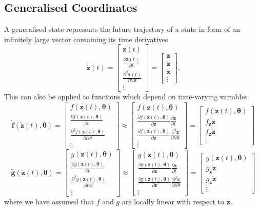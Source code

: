\documentclass[a4paper,10pt]{article}
\newcommand{\bs}[1]{\mathbf{#1}}					%
\newcommand{\bgs}[1]{\boldsymbol{#1}}				%
\newcommand{\pd}[2]{\frac{\partial #1}{\partial #2}} 	%
\newcommand{\ppd}[3]{\frac{\partial^2 #1}{\partial #2 \partial #3}} %
\newcommand{\eq}[1]{\begin{equation} #1 \end{equation}}%
\newcommand{\gc}[1]{\tilde{#1}} %
\renewcommand{\ss}{z}         %
\renewcommand{\sp}{\theta}    %
\newcommand{\ps}{\bs{\ss}}    %
\newcommand{\psg}{\gc{\ps}}    %
\newcommand{\pp}{\bgs{\sp}} %
\begin{document}
\subsection{Generalised Coordinates}
A generalised state represents the future trajectory of a state in form of an infinitely large vector containing its time derivatives
\eq{
    \psg(t) = \left[\begin{array}{c} \ps(t)\\ \pd{\ps(t)}{t}\\ \ppd{\ps(t)}{t}{t}\\ \vdots \end{array}\right] = \left[\begin{array}{c} \ps\\ \dot{\ps}\\ \ddot{\ps}\\ \vdots \end{array}\right].
}
This can also be applied to functions which depend on time-varying variables
\eq{\label{eq:gcf}
    \gc{\bs{f}}(\psg(t),\pp) = \left[\begin{array}{c} f(\ps(t),\pp)\\ \pd{f(\ps(t),\pp)}{t}\\ \ppd{f(\ps(t),\pp)}{t}{t}\\ \vdots \end{array}\right] \approx \left[\begin{array}{c} f(\ps(t),\pp)\\ \pd{f(\ps(t),\pp)}{\ps}\pd{\ps}{t}\\ \pd{f(\ps(t),\pp)}{\ps}\ppd{\ps}{t}{t}\\ \vdots \end{array}\right] = \left[\begin{array}{c} f(\ps(t),\pp)\\ f_\ps\dot{\ps}\\ f_\ps\ddot{\ps}\\ \vdots \end{array}\right]
}
\eq{
    \gc{\bs{g}}(\psg(t),\pp) = \left[\begin{array}{c} g(\ps(t),\pp)\\ \pd{g(\ps(t),\pp)}{t}\\ \ppd{g(\ps(t),\pp)}{t}{t}\\ \vdots \end{array}\right] \approx \left[\begin{array}{c} g(\ps(t),\pp)\\ \pd{g(\ps(t),\pp)}{\ps}\pd{\ps}{t}\\ \pd{g(\ps(t),\pp)}{\ps}\ppd{\ps}{t}{t}\\ \vdots \end{array}\right] = \left[\begin{array}{c} g(\ps(t),\pp)\\ g_\ps\dot{\ps}\\ g_\ps\ddot{\ps}\\ \vdots \end{array}\right]
}
where we have assumed that $f$ and $g$ are locally linear with respect to $\ps$. 
\end{document}

